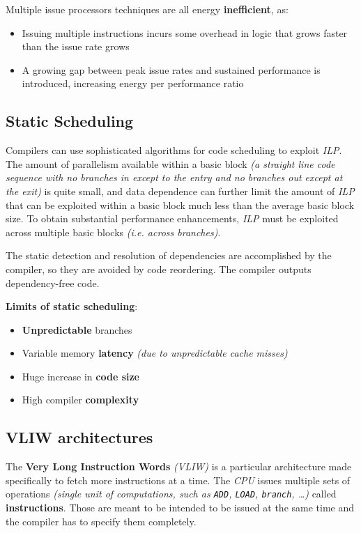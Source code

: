 \documentclass[english]{article}
\begin{document}

Multiple issue processors techniques are all energy \textbf{inefficient}, as:

\begin{itemize}
  \item Issuing multiple instructions incurs some overhead in logic that grows faster than the issue rate grows
  \item A growing gap between peak issue rates and sustained performance is introduced, increasing energy per performance ratio
\end{itemize}

\subsection{Static Scheduling}

Compilers can use sophisticated algorithms for code scheduling to exploit \textit{ILP}.
The amount of parallelism available within a basic block \textit{(a straight line code sequence with no branches in except to the entry and no branches out except at the exit)} is quite small, and
data dependence can further limit the amount of \textit{ILP} that can be exploited within a basic block much less than the average basic block size.
To obtain substantial performance enhancements, \textit{ILP} must be exploited across multiple basic blocks \textit{(i.e. across branches)}.

The static detection and resolution of dependencies are accomplished by the compiler, so they are avoided by code reordering.
The compiler outputs dependency-free code.

\bigskip
\textbf{Limits of static scheduling}:
\begin{itemize}
  \item \textbf{Unpredictable} branches
  \item Variable memory \textbf{latency} \textit{(due to unpredictable cache misses)}
  \item Huge increase in \textbf{code size}
  \item High compiler \textbf{complexity}
\end{itemize}

\subsection{VLIW architectures}

The \textbf{Very Long Instruction Words} \textit{(VLIW)} is a particular architecture made specifically to fetch more instructions at a time.
The \textit{CPU} issues multiple sets of operations \textit{(single unit of computations, such as \texttt{ADD}, \texttt{LOAD}, \texttt{branch}, \ldots) }called \textbf{instructions}.
Those are meant to be intended to be issued at the same time and the compiler has to specify them completely.
\end{document}
